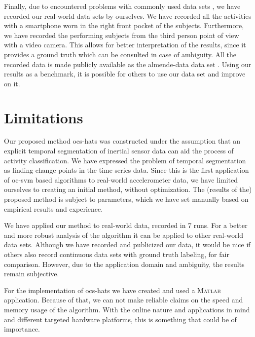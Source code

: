 Finally, due to encountered problems with commonly used data sets \cite{kwapisz2011activity,anguita2012human}, we have recorded our real-world data sets by ourselves.
We have recorded all the activities with a smartphone worn in the right front pocket of the subjects.
Furthermore, we have recorded the performing subjects from the third person point of view with a video camera.
This allows for better interpretation of the results, since it provides a ground truth which can be consulted in case of ambiguity.
All the recorded data is made publicly available as the \gls{almende-data} data set \cite{vlasveld2014acras}.
Using our results as a benchmark, it is possible for others to use our data set and improve on it.

\section{Limitations}\label{sec:limitations}
Our proposed method \gls{ocs-hats} was constructed under the assumption that an explicit temporal segmentation of inertial sensor data can aid the process of activity classification.
We have expressed the problem of temporal segmentation as finding change points in the time series data.
Since this is the first application of \gls{oc-svm} based algorithms to real-world accelerometer data, we have limited ourselves to creating an initial method, without optimization.
The (results of the) proposed method is subject to parameters, which we have set manually based on empirical results and experience.

We have applied our method to real-world data, recorded in 7 runs.
For a better and more robust analysis of the algorithm it can be applied to other real-world data sets.
Although we have recorded and publicized our data, it would be nice if others also record continuous data sets with ground truth labeling, for fair comparison.
However, due to the application domain and ambiguity, the results remain subjective.

For the implementation of \gls{ocs-hats} we have created and used a \textsc{Matlab} application.
Because of that, we can not make reliable claims on the speed and memory usage of the algorithm.
With the online nature and applications in mind and different targeted hardware platforms, this is something that could be of importance.

